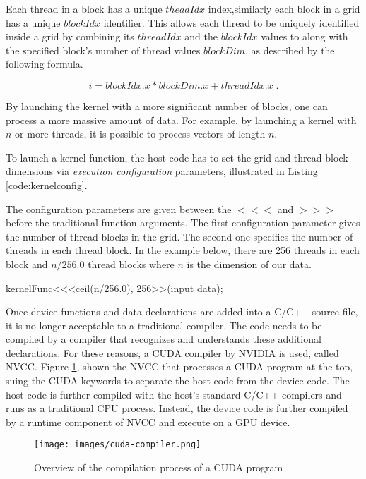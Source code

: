 \documentclass[12pt,a4paper]{extarticle}
\newcommand{\linespace}{\vspace{0pt}}
\begin{document}
Each thread in a block has a unique $theadIdx$ index,similarly each block in a grid has a unique $blockIdx$ identifier. This allows each thread to be uniquely identified inside a grid by combining its $threadIdx$ and the $blockIdx$ values to along with the specified block's number of thread values $blockDim$, as described by the following formula.

\[
i = blockIdx.x * blockDim.x + threadIdx.x \;.
\]

By launching the kernel with a more significant number of blocks, one can process a more massive amount of data. For example, by launching a kernel with $n$ or more threads, it is possible to process vectors of length $n$.
\linespace

To launch a kernel function, the host code has to set the grid and thread block dimensions via \textit{execution configuration} parameters, illustrated in Listing \ref{code:kernelconfig}.

The configuration parameters are given between the $<<<$ and $>>>$ before the traditional function arguments. The first configuration parameter gives the number of thread blocks in the grid. The second one specifies the number of threads in each thread block. In the example below, there are 256 threads in each block and $n/256.0$ thread blocks where $n$ is the dimension of our data.

\begin{cpp}[caption={A kernel function launch statement.},label=code:kernelconfig]
kernelFunc<<<ceil(n/256.0), 256>>(input data);
\end{cpp}

Once device functions and data declarations are added into a C/C++ source file, it is no longer acceptable to a traditional compiler. The code needs to be compiled by a compiler that recognizes and understands these additional declarations. For these reasons, a CUDA compiler by NVIDIA is used, called NVCC.
Figure \ref{fig:cudacompiler}, shown the NVCC that processes a CUDA program at the top, suing the CUDA keywords to separate the host code from the device code. The host code is further compiled with the host's standard C/C++ compilers and runs as a traditional CPU process. Instead, the device code is further compiled by a runtime component of NVCC and execute on a GPU device.

\begin{figure}[hbtp]
\centering
\texttt{[image: images/cuda-compiler.png]}
\caption{Overview of the compilation process of a CUDA program}
\label{fig:cudacompiler}
\end{figure}
\end{document}
